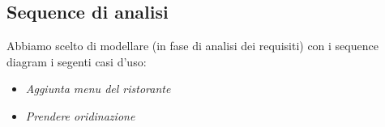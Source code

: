 \subsection{Sequence di analisi}

    \begin{flushleft}
        Abbiamo scelto di modellare (in fase di analisi dei requisiti) con i sequence diagram i segenti casi d'uso:
        \begin{itemize}
            \item  \emph{Aggiunta menu del ristorante}
            \item  \emph{Prendere oridinazione}
        \end{itemize}
    \end{flushleft}
